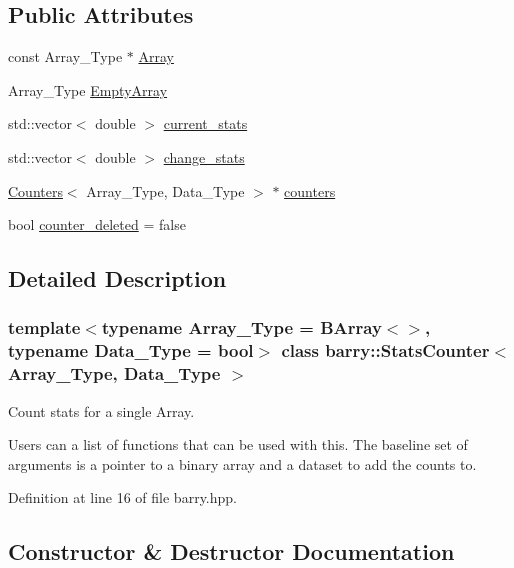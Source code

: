 \subsection*{Public Attributes}
\begin{DoxyCompactItemize}
\item 
const Array\+\_\+\+Type $\ast$ \hyperlink{classbarry_1_1_stats_counter_a4a963a5edf23d0527e1ef87c52c04a97}{Array}
\item 
Array\+\_\+\+Type \hyperlink{classbarry_1_1_stats_counter_ad78463fadfa385a69121c40fdc8fd193}{Empty\+Array}
\item 
std\+::vector$<$ double $>$ \hyperlink{classbarry_1_1_stats_counter_ad99718884cffbeca3cb98d574f6956a1}{current\+\_\+stats}
\item 
std\+::vector$<$ double $>$ \hyperlink{classbarry_1_1_stats_counter_a90b8fddb02b2628cc8d71986f8cdf0ed}{change\+\_\+stats}
\item 
\hyperlink{classbarry_1_1_counters}{Counters}$<$ Array\+\_\+\+Type, Data\+\_\+\+Type $>$ $\ast$ \hyperlink{classbarry_1_1_stats_counter_a7100901cfe8f02c96b76b381fa06f94c}{counters}
\item 
bool \hyperlink{classbarry_1_1_stats_counter_a0e9924b44520a91c7384a464fa9711b7}{counter\+\_\+deleted} = false
\end{DoxyCompactItemize}


\subsection{Detailed Description}
\subsubsection*{template$<$typename Array\+\_\+\+Type = B\+Array$<$$>$, typename Data\+\_\+\+Type = bool$>$\newline
class barry\+::\+Stats\+Counter$<$ Array\+\_\+\+Type, Data\+\_\+\+Type $>$}

Count stats for a single Array. 

Users can a list of functions that can be used with this. The baseline set of arguments is a pointer to a binary array and a dataset to add the counts to. 

Definition at line 16 of file barry.\+hpp.



\subsection{Constructor \& Destructor Documentation}
\mbox{\label{classbarry_1_1_stats_counter_a43e9fa90ef0b1fb716f0e75d1b803ef1}} 
